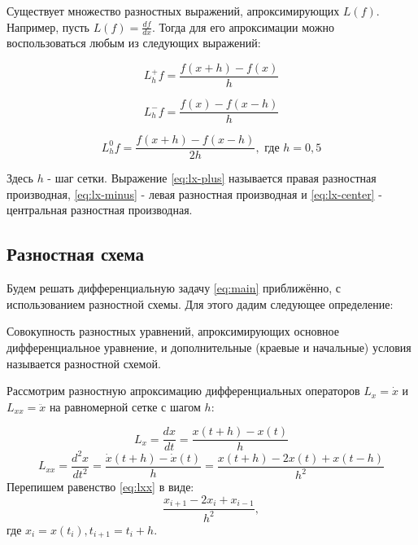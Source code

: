Существует множество разностных выражений, апроксимирующих $L(f)$. Например, пусть $L(f) = \frac{df}{dx}$. Тогда для его
апроксимации можно воспользоваться любым из следующих выражений:

\begin{equation}
    \label{eq:lx-plus}
    L_h^+f = \frac{f(x + h) - f(x)}{h}
\end{equation}

\begin{equation}
    \label{eq:lx-minus}
    L_h^-f = \frac{f(x) - f(x - h)}{h}
\end{equation}

\begin{equation}
    \label{eq:lx-center}
    L_h^0f = \frac{f(x + h) - f(x - h)}{2h}, \text{ где } h = 0,5
\end{equation}

\noindent Здесь $h$ - шаг сетки. Выражение \ref{eq:lx-plus} называется правая разностная производная, \ref{eq:lx-minus}
- левая разностная производная и \ref{eq:lx-center} - центральная разностная производная.

\subsection{Разностная схема}

Будем решать дифференциальную задачу \ref{eq:main} приближённо, с использованием разностной схемы. Для этого дадим следующее
определение:

\begin{definition}
    Совокупность разностных уравнений, апроксимирующих основное дифференциальное уравнение, и дополнительные
    (краевые и начальные) условия называется разностной схемой.
\end{definition}

Рассмотрим разностную апроксимацию дифференциальных операторов $L_x = \dot{x}$ и $L_{xx} = \ddot{x}$ на равномерной сетке
с шагом $h$:

\begin{equation}
    L_x = \frac{dx}{dt} = \frac{x(t + h) - x(t)}{h}
\end{equation}
\begin{equation}
    \label{eq:lxx}
    L_{xx} = \frac{d^2x}{dt^2} = \frac{\dot{x}(t + h) - \dot{x}(t)}{h} = \frac{x(t + h) - 2x(t) + x(t - h)}{h^2}
\end{equation}
Перепишем равенство \ref{eq:lxx} в виде:
\begin{equation}
    \label{eq:approximation}
    \frac{x_{i+1} - 2x_i + x_{i-1}}{h^2},
\end{equation}
где $x_i = x(t_i), t_{i+1} = t_i + h$.

